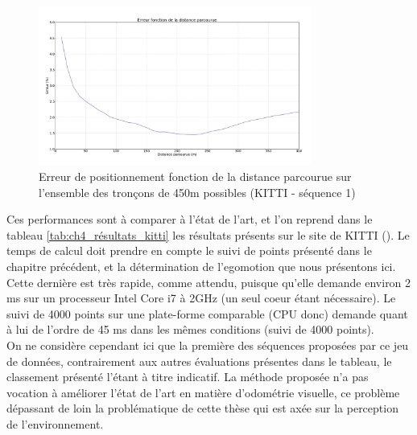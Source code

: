\begin{figure} 
	\includegraphics[width=0.8\textwidth]{Chapter4/graphics/error_over_distance_-_sliding_window.png}
	\caption{Erreur de positionnement fonction de la distance parcourue sur l'ensemble des tronçons de 450m possibles (KITTI - séquence 1)}
	\label{fig:ch4_error_over_distance}
\end{figure}

Ces performances sont à comparer à l'état de l'art, et l'on reprend dans le tableau \ref{tab:ch4_résultats_kitti} les résultats présents sur le site de KITTI (\cite{KIT}). Le temps de calcul doit prendre en compte le suivi de points présenté dans le chapitre précédent, et la détermination de l'egomotion que nous présentons ici. Cette dernière est très rapide, comme attendu, puisque qu'elle demande environ 2 ms sur un processeur Intel Core i7 à 2GHz (un seul coeur étant nécessaire). Le suivi de 4000 points sur une plate-forme comparable (CPU donc) demande quant à lui de l'ordre de 45 ms dans les mêmes conditions (suivi de 4000 points).\\

On ne considère cependant ici que la première des séquences proposées par ce jeu de données, contrairement aux autres évaluations présentes dans le tableau, le classement présenté l'étant à titre indicatif. La méthode proposée n'a pas vocation à améliorer l'état de l'art en matière d'odométrie visuelle, ce problème dépassant de loin la problématique de cette thèse qui est axée sur la perception de l'environnement. \\


